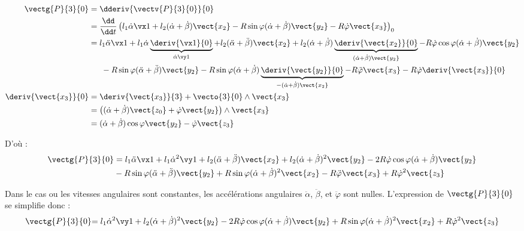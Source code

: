 \ifprof
\begin{corrige}

\begin{align*}
\vectg{P}{3}{0}&=\dderiv{\vectv{P}{3}{0}}{0}\\
	&=\dfrac{\dd}{\dd t}\left( l_1\dot\alpha\vx1+l_2(\dot\alpha+\dot\beta)\vect{x_2}-R\sin\varphi(\dot\alpha+\dot\beta)\vect{y_2}-R\dot\varphi\vect{x_3} \right)_0 \\
	&=l_1 \ddot\alpha\vx1+l_1 \dot\alpha\underbrace{\deriv{\vx1}{0}}_{\dot\alpha\vy1} + l_2(\ddot\alpha + \ddot\beta)\vect{x_2}+ l_2(\dot\alpha+\dot\beta)\underbrace{\deriv{\vect{x_2}}{0}}_{(\dot\alpha+\dot\beta)\vect{y_2}}-R\dot\varphi\cos\varphi(\dot\alpha+\dot\beta)\vect{y_2}\\
	&\phantom{==}-R\sin\varphi(\ddot\alpha+\ddot\beta)\vect{y_2}-R\sin\varphi(\dot\alpha+\dot\beta)\underbrace{\deriv{\vect{y_2}}{0}}_{-(\dot\alpha+\dot\beta)\vect{x_2}}-R\ddot\varphi\vect{x_3} -R\dot\varphi\deriv{\vect{x_3}}{0}\\
\deriv{\vect{x_3}}{0}&={\deriv{\vect{x_3}}{3}}+\vecto{3}{0}\wedge\vect{x_3}\\
		&=\left((\dot\alpha+\dot\beta)\vect{z_0}+\dot\varphi\vect{y_2}\right)\wedge\vect{x_3}\\
		&=(\dot\alpha+\dot\beta)\cos\varphi\vect{y_2}-\dot\varphi\vect{z_3}
		\end{align*}
		
D'où :
\begin{align*}
\vectg{P}{3}{0}&=l_1 \ddot\alpha\vx1+l_1 \dot\alpha^2\vy1 + l_2(\ddot\alpha + \ddot\beta)\vect{x_2}+ l_2(\dot\alpha+\dot\beta)^2\vect{y_2}-2R\dot\varphi\cos\varphi(\dot\alpha+\dot\beta)\vect{y_2}\\
	& -R\sin\varphi(\ddot\alpha+\ddot\beta)\vect{y_2}+R\sin\varphi(\dot\alpha+\dot\beta)^2\vect{x_2}-R\ddot\varphi\vect{x_3} +R\dot\varphi^2\vect{z_3}
\end{align*}


\end{corrige}\else\fi

\ifprof
\begin{corrige}

Dans le cas ou les vitesses angulaires sont constantes, les accélérations angulaires $\ddot\alpha$, $\ddot\beta$, et $\ddot\varphi$ sont nulles. L'expression de $\vectg{P}{3}{0}$ se simplifie donc :
\begin{align*}
{\vectg{P}{3}{0}}{=l_1 \dot\alpha^2\vy1 + l_2(\dot\alpha+\dot\beta)^2\vect{y_2}-2R\dot\varphi\cos\varphi(\dot\alpha+\dot\beta)\vect{y_2}+ R\sin\varphi(\dot\alpha+\dot\beta)^2\vect{x_2} +R\dot\varphi^2\vect{z_3}}\\
\end{align*}

\end{corrige}\else\fi

